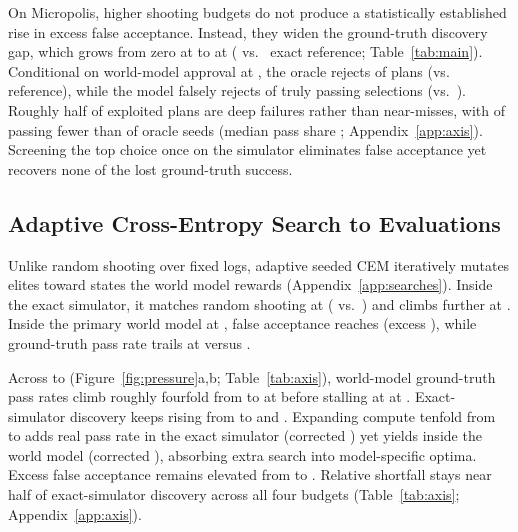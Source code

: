 On Micropolis, higher shooting budgets do not produce a statistically established rise in excess false acceptance. Instead, they widen the ground-truth discovery gap, which grows from zero at  to \RandThouShort{} \ci{\PaRandThouShortCI} at  (\RandThouOrAcc{} vs.\ \RandThouPerfOrAcc{} exact reference; Table~\ref{tab:main}). Conditional on world-model approval at , the oracle rejects \RandThouCondRej{} \ci{\RandThouCondRejCI} of plans (vs.\ \RandThouPerfCondRej{} reference), while the model falsely rejects \RandThouFalseRej{} of truly passing selections (vs.\ \RandThouPerfFalseRej{}). Roughly half of exploited plans are deep failures rather than near-misses, with \DepthRandLow{} of \DepthRandN{} passing fewer than \DepthCut{} of oracle seeds (median pass share \DepthRandMedian{}; Appendix~\ref{app:axis}). Screening the top choice once on the simulator eliminates false acceptance yet recovers none of the \RandThouShort{} lost ground-truth success.

\subsection{Adaptive Cross-Entropy Search to  Evaluations}

Unlike random shooting over fixed logs, adaptive seeded CEM iteratively mutates elites toward states the world model rewards (Appendix~\ref{app:searches}). Inside the exact simulator, it matches random shooting at  (\AdThouPerfOrAcc{} vs.\ \RandThouPerfOrAcc{}) and climbs further at . Inside the primary world model at , false acceptance reaches \AdThouHack{} \ci{\AdThouHackCI} (excess \AdThouDiff{} \ci{\AdThouDiffCI}), while ground-truth pass rate trails at \AdThouOrAcc{} \ci{\AdThouOrAccCI} versus \AdThouPerfOrAcc{} \ci{\AdThouPerfOrAccCI}.

Across  to  (Figure~\ref{fig:pressure}a,b; Table~\ref{tab:axis}), world-model ground-truth pass rates climb roughly fourfold from \PaTenOrAcc{} to \PaThouOrAcc{} at  before stalling at \PaTenThouOrAcc{} at . Exact-simulator discovery keeps rising from \PaTenPerfOrAcc{} to \PaThouPerfOrAcc{} and \PaTenThouPerfOrAcc{}. Expanding compute tenfold from  to  adds \PaPerfOrAccRise{} real pass rate in the exact simulator (corrected \PaPerfOrAccRiseCorrCI) yet yields \PaEmuOrAccRise{} inside the world model (corrected \PaEmuOrAccRiseCorrCI), absorbing extra search into model-specific optima. Excess false acceptance remains elevated from \PaTenExcess{} to \PaTenThouExcess{} \ci{\PaTenThouExcessCI}. \PressureRiseSentence{} \PaShortSentence{} Relative shortfall stays near half of exact-simulator discovery across all four budgets (Table~\ref{tab:axis}; Appendix~\ref{app:axis}).

